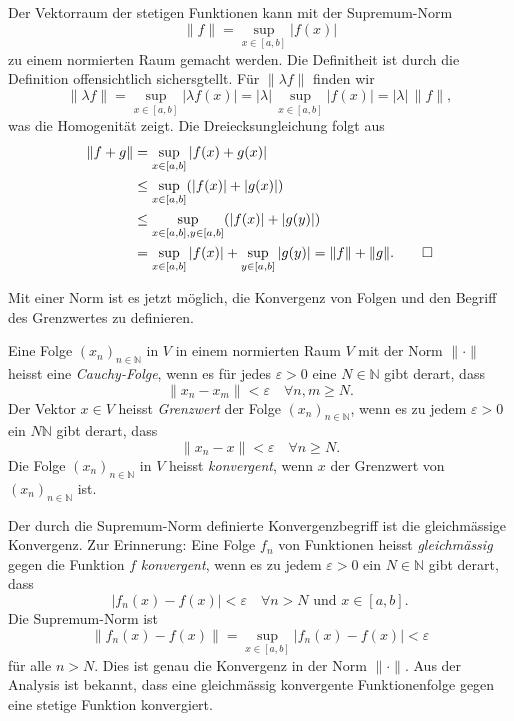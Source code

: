 \begin{beispiel}
Der Vektorraum der stetigen Funktionen kann mit der Supremum-Norm
\[
\|f\| = \sup_{x\in[a,b]} |f(x)|
\]
zu einem normierten Raum gemacht werden.
Die Definitheit ist durch die Definition offensichtlich sichersgtellt.
Für $\|\lambda f\|$ finden wir
\[
\|\lambda f\|
=
\sup_{x\in[a,b]} |\lambda f(x)|
=
|\lambda|\,
\sup_{x\in[a,b]} |f(x)|
=
|\lambda|\, \|f\|,
\]
was die Homogenität zeigt.
Die Dreiecksungleichung folgt aus
\begin{align*}
\|f+g\|
&=
\sup_{x\in[a,b]} |f(x)+g(x)|
\\
&\le
\sup_{x\in[a,b]} (|f(x)|+|g(x)|)
\\
&\le
\sup_{x\in[a,b], y\in[a,b]} (|f(x)|+|g(y)|)
\\
&=
\sup_{x\in[a,b]} |f(x)|
+
\sup_{y\in[a,b]} |g(y)|
=
\|f\| + \|g\|.
\qedhere
\end{align*}
\end{beispiel}

Mit einer Norm ist es jetzt möglich, die Konvergenz von Folgen und den
Begriff des Grenzwertes zu definieren.

\begin{definition}
Eine Folge $(x_n)_{n\in\mathbb{N}}$ in $V$ in einem normierten Raum $V$
mit der Norm $\|\cdot\|$
heisst eine {\em Cauchy-Folge}, wenn es für jedes $\varepsilon>0$ eine
%
$N\in \mathbb{N}$ gibt derart, dass
\[
\| x_n - x_m \| < \varepsilon
\quad\forall n,m\ge N.
\]
Der Vektor $x\in V$ heisst {\em Grenzwert} der Folge $(x_n)_{n\in\mathbb{N}}$,
%
wenn es zu jedem $\varepsilon > 0$ ein $N\mathbb{N}$ gibt derart, dass
\[
\|x_n-x\| < \varepsilon 
\quad\forall n\ge N.
\]
Die Folge $(x_n)_{n\in\mathbb{N}}$  in $V$ heisst {\em konvergent}, wenn
%
$x$ der Grenzwert von $(x_n)_{n\in\mathbb{N}}$ ist.
\end{definition}

Der durch die Supremum-Norm definierte Konvergenzbegriff ist die gleichmässige
Konvergenz.
Zur Erinnerung:
Eine Folge $f_n$ von Funktionen heisst {\em gleichmässig}
gegen die
%
Funktion $f$ {\em konvergent}, wenn es zu jedem
$\varepsilon >0$ ein $N\in\mathbb{N}$ gibt derart, dass
\[
|f_n(x) - f(x)|<\varepsilon\quad\forall n>N\text{ und }x\in [a,b].
\]
Die Supremum-Norm ist
\[
\|f_n(x) - f(x)\|
=
\sup_{x\in[a,b]} |f_n(x)-f(x)| < \varepsilon
\]
für alle $n>N$.
Dies ist genau die Konvergenz in der Norm $\|\cdot\|$.
Aus der Analysis ist bekannt, dass eine gleichmässig konvergente 
Funktionenfolge gegen eine stetige Funktion konvergiert.

